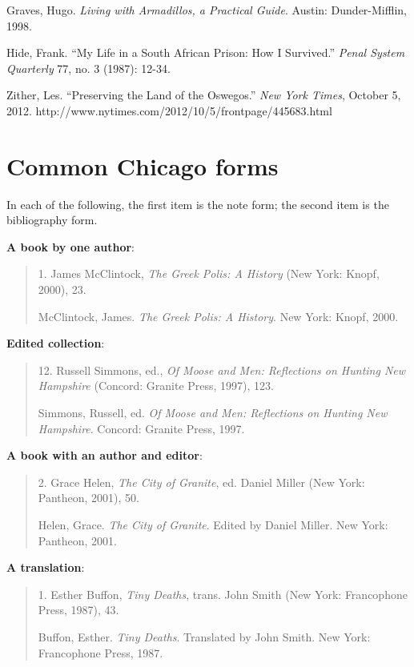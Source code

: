Graves, Hugo. \emph{Living with Armadillos, a Practical Guide}. Austin: Dunder-Mifflin,  1998.

Hide, Frank. ``My Life in a South African Prison: How I Survived.'' \emph{Penal System  Quarterly} 
77, no. 3 (1987): 12-34.

Zither, Les. ``Preserving the Land of the Oswegos.'' \emph{New York Times}, October 5,  2012. http://www.nytimes.com/2012/10/5/frontpage/445683.html


\newpage




\section{Common Chicago forms}

In each of the following, the first item is the note form; the second item is the bibliography form.
	 	 	
\textbf{A book by one author}:

\begin{quote}
 1. James McClintock, \emph{The Greek Polis: A History} (New York: Knopf, 2000), 23.

McClintock, James. \emph{The Greek Polis: A History}. New York: Knopf,  2000.
\end{quote}


\textbf{Edited collection}:
\begin{quote}
 12. Russell Simmons, ed., \emph{Of Moose and Men: Reflections on Hunting New Hampshire} (Concord: Granite Press, 1997), 123.

Simmons, Russell, ed. \emph{Of Moose and Men: Reflections on Hunting New  Hampshire}. Concord: Granite Press, 1997.
\end{quote}

\textbf{A book with an author and editor}:

\begin{quote}
 2. Grace Helen, \emph{The City of Granite}, ed. Daniel Miller (New York: Pantheon, 2001), 50.

Helen, Grace. \emph{The City of Granite}. Edited by Daniel Miller. New York:  Pantheon, 2001.
\end{quote}

\textbf{A translation}:
\begin{quote}
 1. Esther Buffon, \emph{Tiny Deaths}, trans. John Smith (New York: Francophone Press, 1987), 43.

Buffon, Esther. \emph{Tiny Deaths}. Translated by John Smith. New York:  Francophone Press, 1987.
\end{quote}


